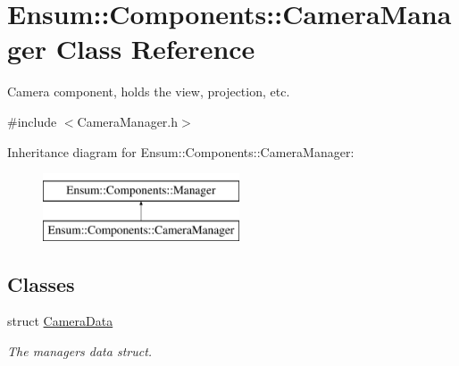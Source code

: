 \hypertarget{class_ensum_1_1_components_1_1_camera_manager}{}\section{Ensum\+:\+:Components\+:\+:Camera\+Manager Class Reference}
\label{class_ensum_1_1_components_1_1_camera_manager}


Camera component, holds the view, projection, etc.  




{\ttfamily \#include $<$Camera\+Manager.\+h$>$}

Inheritance diagram for Ensum\+:\+:Components\+:\+:Camera\+Manager\+:\begin{figure}[H]
\begin{center}
\leavevmode
\includegraphics[height=2.000000cm]{class_ensum_1_1_components_1_1_camera_manager}
\end{center}
\end{figure}
\subsection*{Classes}
\begin{DoxyCompactItemize}
\item 
struct \hyperlink{struct_ensum_1_1_components_1_1_camera_manager_1_1_camera_data}{Camera\+Data}
\begin{DoxyCompactList}\small\item\em The managers data struct. \end{DoxyCompactList}\end{DoxyCompactItemize}
